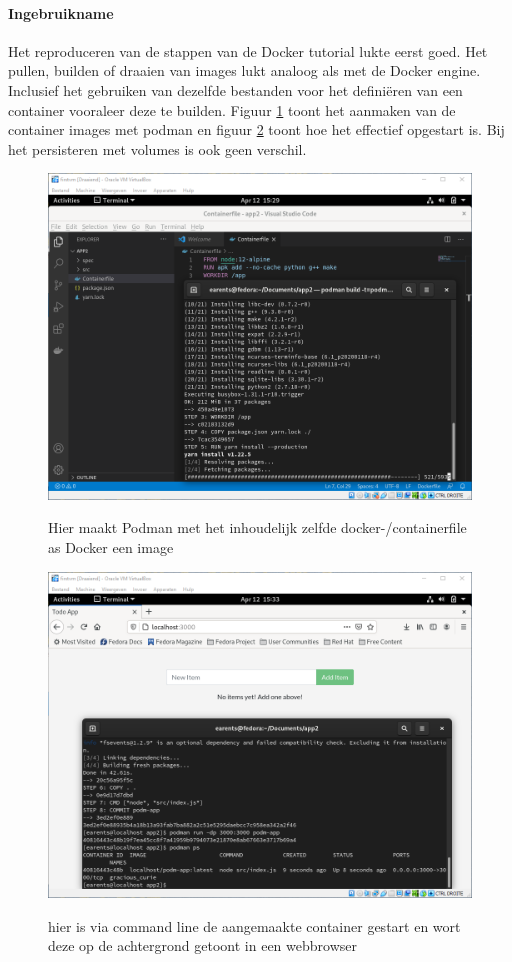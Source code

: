 \paragraph{Ingebruikname}
Het reproduceren van de stappen van de Docker tutorial lukte eerst goed.  Het pullen, builden of draaien van images lukt analoog als met de Docker engine. Inclusief het gebruiken van dezelfde bestanden voor het definiëren van een container vooraleer deze te builden. Figuur \ref{fig:podmanbuild} toont het aanmaken van de container images met podman en figuur \ref{fig:podmanrun} toont hoe het effectief opgestart is.  Bij het persisteren met volumes is ook geen verschil.
\begin{figure}[h]
    \includegraphics[width=\linewidth]{img/podmanbuild.png}
    \label{fig:podmanbuild}
    \caption[Een dockerfile in VS code om met podman te builden]{Hier maakt Podman met het inhoudelijk zelfde docker-/containerfile as Docker een image}
    \centering
\end{figure}
\begin{figure}[h]
    \includegraphics[width=\linewidth]{img/podmanrun.png}
    \label{fig:podmanrun}
    \caption[Podman die een web ap uitvoert]{hier is via command line de aangemaakte container gestart en wort deze op de achtergrond getoont in een webbrowser}
    \centering
\end{figure}


